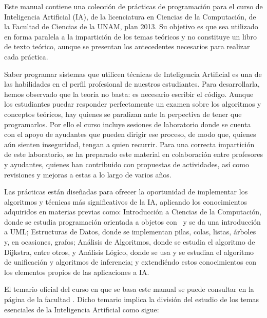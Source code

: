 
Este manual contiene una colección de prácticas de programación para el curso de Inteligencia Artificial (IA), de la licenciatura en Ciencias de la Computación, de la Facultad de Ciencias de la UNAM, plan 2013.  Su objetivo es que sea utilizado en forma paralela a la impartición de los temas teóricos y no constituye un libro de texto teórico, aunque se presentan los antecedentes necesarios para realizar cada práctica.

Saber programar sistemas que utilicen técnicas de Inteligencia Artificial es una de las habilidades en el perfil profesional de nuestros estudiantes.  Para desarrollarla, hemos observado que la teoría no basta: es necesario escribir el código.  Aunque los estudiantes puedar responder perfectamente un examen sobre los algoritmos y conceptos teóricos, hay quienes se paralizan ante la perpectiva de tener que programarlos.  Por ello el curso incluye sesiones de laboratorio donde se cuenta con el apoyo de ayudantes que pueden dirigir ese proceso, de modo que, quienes aún sienten inseguridad, tengan a quien recurrir.  Para una correcta impartición de este laboratorio, se ha preparado este material en colaboración entre profesores y ayudantes, quienes han contribuido con propuestas de actividades, así como revisiones y mejoras a estas a lo largo de varios años.

Las prácticas están diseñadas para ofrecer la oportunidad de implementar los algoritmos y técnicas más significativos de la IA, aplicando los conocimientos adquiridos en materias previas como: Introducción a Ciencias de la Computación, donde se estudia programación orientada a objetos con \Java\ y se da una introducción a UML; Estructuras de Datos, donde se implementan pilas, colas, listas, árboles y, en ocasiones, grafos; Análisis de Algoritmos, donde se estudia el algoritmo de Dijkstra, entre otros, y Análisis Lógico, donde se usa  y se estudian el algoritmo de unificación y algoritmos de inferencia; y extendiéndo estos conocimientos con los elementos propios de las aplicaciones a IA.

El temario oficial del curso en que se basa este manual se puede consultar en la página de la facultad .  Dicho temario implica la división del estudio de los temas esenciales de la Inteligencia Artificial como sigue:

